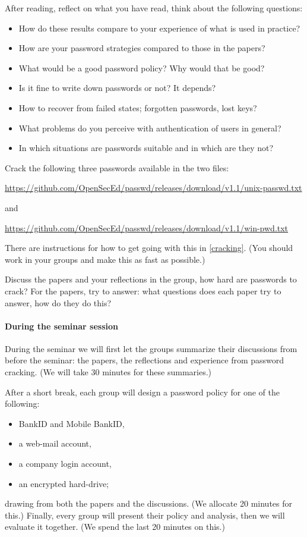 After reading, reflect on what you have read, think about the following 
questions:
\begin{itemize}
  \item How do these results compare to your experience of what is used in 
    practice?
  \item How are your password strategies compared to those in the papers?
  \item What would be a good password policy?
    Why would that be good?
  \item Is it fine to write down passwords or not?
    It depends?
  \item How to recover from failed states; \eg forgotten passwords, lost keys?
  \item What problems do you perceive with authentication of users in general?
  \item In which situations are passwords suitable and in which are they not?
\end{itemize}

Crack the following three passwords available in the two files:
\begin{center}
  \url{https://github.com/OpenSecEd/passwd/releases/download/v1.1/unix-passwd.txt}
\end{center}
and
\begin{center}
  \url{https://github.com/OpenSecEd/passwd/releases/download/v1.1/win-pwd.txt}
\end{center}
There are instructions for how to get going with this in \cref{cracking}.
(You should work in your groups and make this as fast as possible.)

Discuss the papers and your reflections in the group, how hard are passwords to 
crack?
For the papers, try to answer: what questions does each paper try to answer, 
how do they do this?

\paragraph{During the seminar session}

During the seminar we will first let the groups summarize their discussions 
from before the seminar: the papers, the reflections and experience from 
password cracking.
(We will take 30 minutes for these summaries.)

After a short break, each group will design a password policy for one of the 
following:
\begin{itemize}
  \item BankID and Mobile BankID,
  \item a web-mail account,
  \item a company login account,
  \item an encrypted hard-drive;
\end{itemize}
drawing from both the papers and the discussions.
(We allocate 20 minutes for this.)
Finally, every group will present their policy and analysis, then we will 
evaluate it together.
(We spend the last 20 minutes on this.)

